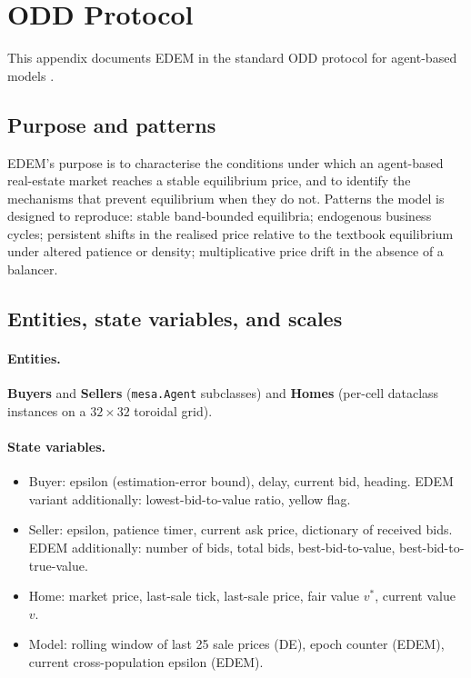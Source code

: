 \section{ODD Protocol}
\label{app:odd}

This appendix documents EDEM in the standard ODD protocol for
agent-based models \citep{grimm2020odd}.

\subsection{Purpose and patterns}

EDEM's purpose is to characterise the conditions under which an
agent-based real-estate market reaches a stable equilibrium price,
and to identify the mechanisms that prevent equilibrium when they
do not. Patterns the model is designed to reproduce: stable
band-bounded equilibria; endogenous business cycles; persistent
shifts in the realised price relative to the textbook equilibrium
under altered patience or density; multiplicative price drift in the
absence of a balancer.

\subsection{Entities, state variables, and scales}

\paragraph{Entities.} \textbf{Buyers} and \textbf{Sellers}
(\texttt{mesa.Agent} subclasses) and \textbf{Homes} (per-cell
dataclass instances on a $32 \times 32$ toroidal grid).

\paragraph{State variables.}
\begin{itemize}[leftmargin=*,nosep]
\item Buyer: epsilon (estimation-error bound), delay, current bid,
      heading. EDEM variant additionally: lowest-bid-to-value ratio,
      yellow flag.
\item Seller: epsilon, patience timer, current ask price, dictionary
      of received bids. EDEM additionally: number of bids, total
      bids, best-bid-to-value, best-bid-to-true-value.
\item Home: market price, last-sale tick, last-sale price, fair value
      $v^{*}$, current value $v$.
\item Model: rolling window of last 25 sale prices (DE), epoch
      counter (EDEM), current cross-population epsilon (EDEM).
\end{itemize}

